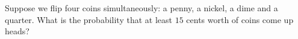 Suppose we flip four coins simultaneously: a penny, a nickel, a dime and a quarter. What is the probability that at least $15$ cents worth of coins come up heads?
